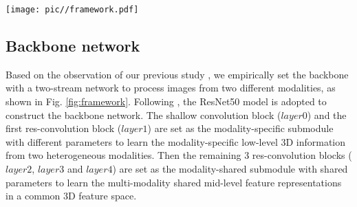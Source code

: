 \documentclass[journal]{IEEEtran}
\begin{document}
\begin{figure*}
\centering
\texttt{[image: pic//framework.pdf]}
\caption{The proposed dual-granularity triplet loss based feature learning framework for VT-ReID, including two components: backbone network and dual-granularity triplet loss module. The backbone network contains two modality-specific submodules with independent parameters and one modality-shared submodule with shared parameters.
The dual-granularity triplet loss module focuses on learning high quality person features with inter-class discrimination and intra-class compactness ability.
At the beginning, the 3D feature maps outputted from the backbone are respectively processed by two pooling methods in the fine granularity branch and coarse granularity branch.
In fine granularity branch, the pooling features are supervised by the sample-based triplet loss ($L_{f\_tri}$) and identification loss ($L_{id}$) with BNNeck \cite{Luo2019ASB} to obtain features $f_{bn}$, following the black lines (our baseline). Meanwhile, in the coarse granularity branch, the pooling features are firstly fused with $f_{bn}$. Afterwards, the fused features are supervised by the center-based triplet loss ($L_{c\_tri}$) and identification loss ($L_{id}$) from the coarse granularity level to obtain features $f_{bnf}$, following the additional red lines. During testing, the $f_{bn}$ and $f_{bnf}$  with L2 normalization can be adopted as the person features.}
\label{fig:framework}
\end{figure*}

\subsection{Backbone network}
\label{ssec:backbone}
Based on the observation of our previous study \cite{Liu2020ParametersSE}, we empirically set the backbone with a two-stream network to process images from two different modalities, as shown in Fig. \ref{fig:framework}.
Following \cite{ye2020vipr,Liu2020ParametersSE,ye2020dynamic}, the ResNet50 \cite{he2016deep} model is adopted to construct the backbone network. The shallow convolution block ($layer0$) and the first res-convolution block ($layer1$) are set as the modality-specific submodule with different parameters to learn the modality-specific low-level 3D information from two heterogeneous modalities. Then the remaining 3 res-convolution blocks ($layer2$, $layer3$ and $layer4$) are set as the modality-shared submodule with shared parameters to learn the multi-modality shared mid-level feature representations in a common 3D feature space.
\end{document}
